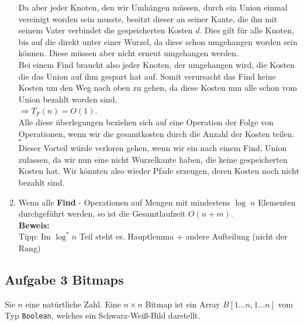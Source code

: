 \documentclass[11pt,a4paper,ngerman]{article}
\begin{document}
\begin{enumerate}[\bfseries (a)]
Da aber jeder Knoten, den wir Umhängen müssen, durch ein Union einmal vereinigt worden sein musste, besitzt dieser an seiner Kante, die ihn mit seinem Vater verbindet die gespeicherten Kosten $d$. Dies gilt für alle Knoten, bis auf die direkt unter einer Wurzel, da diese schon umgehangen worden sein können. Diese müssen aber nicht erneut umgehangen werden.\\

Bei einem Find braucht also jeder Knoten, der umgehangen wird, die Kosten die das Union auf ihm gespart hat auf. Somit verursacht das Find keine Kosten um den Weg nach oben zu gehen, da diese Kosten nun alle schon vom Union bezahlt worden sind.\\
$\Rightarrow T_F(n) = O(1)$.\\
Alle diese überlegungen beziehen sich auf eine Operation der Folge von Operationen, wenn wir die gesamtkosten durch die Anzahl der Kosten teilen.\\

\mbox{} \hfill $\square$\\

Dieser Vorteil würde verloren gehen, wenn wir ein nach einem Find, Union zulassen, da wir nun eine nicht Wurzelkante haben, die keine gespeicherten Kosten hat. Wir könnten also wieder Pfade erzeugen, deren Kosten noch nicht bezahlt sind.

\item Wenn alle \textbf{Find} - Operationen auf Mengen mit mindestens $\log \; n$ Elementen durchgeführt werden, so ist die Gesamtlaufzeit $O(n + m)$.\\

\textbf{Beweis:}\\

Tipp: Im $\log^* n$ Teil steht es. Hauptlemma + andere Aufteilung (nicht der Rang)

\end{enumerate}

\subsection*{Aufgabe 3 \mdseries Bitmaps}

Sie $n$ eine natürtliche Zahl. Eine $ n \times n $ Bitmap ist ein Array $B[1 ... n, 1 ... n]$ vom Typ \texttt{Boolean}, welches ein Schwarz-Weiß-Bild darstellt.
\end{document}

